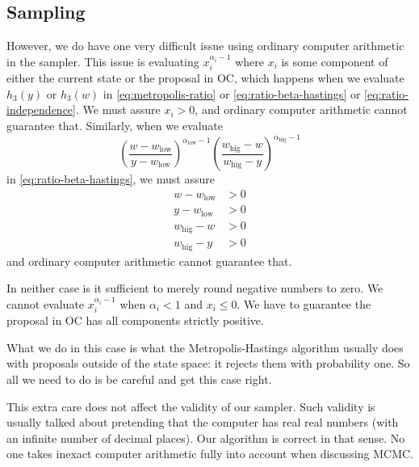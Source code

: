\documentclass[11pt]{article}
\begin{document}
\subsection{Sampling}

However, we do have one very difficult issue using ordinary computer
arithmetic in the sampler.  This issue is evaluating
$x_i^{\alpha_i - 1}$ where $x_i$ is some component of either the
current state or the proposal in OC, which happens when we evaluate
$h_3(y)$ or $h_3(w)$ in \eqref{eq:metropolis-ratio} or
\eqref{eq:ratio-beta-hastings} or \eqref{eq:ratio-independence}.
We must assure $x_i > 0$,
and ordinary computer arithmetic cannot guarantee that.
Similarly, when we evaluate
$$
   \left( \frac{w - w_\text{low}}{y - w_\text{low}}
   \right)^{\alpha_\text{low} - 1}
   \left( \frac{w_\text{hig} - w}{w_\text{hig} - y}
   \right)^{\alpha_\text{hig} - 1}
$$
in \eqref{eq:ratio-beta-hastings}, we must assure
\begin{align*}
   w - w_\text{low} & > 0
   \\
   y - w_\text{low} & > 0
   \\
   w_\text{hig} - w & > 0
   \\
   w_\text{hig} - y & > 0
\end{align*}
and ordinary computer arithmetic cannot guarantee that.

In neither case is it sufficient to merely round negative numbers to zero.
We cannot evaluate $x_i^{\alpha_i - 1}$ when $\alpha_i < 1$ and $x_i \le 0$.
We have to guarantee the proposal in OC has all components strictly positive.

What we do in this case is what the Metropolis-Hastings algorithm usually
does with proposals outside of the state space: it rejects them with
probability one.  So all we need to do is be careful and get this case right.

This extra care does not affect the validity of our sampler.  Such validity
is usually talked about pretending that the computer has real real numbers
(with an infinite number of decimal places).  Our algorithm is correct in
that sense.  No one takes inexact computer arithmetic fully into account
when discussing MCMC.
\end{document}
